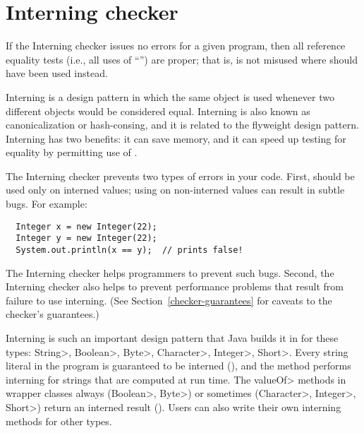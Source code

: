 \htmlhr
\chapter{Interning checker\label{interning-checker}}


If the Interning checker issues no errors for a given program, then all
reference equality tests (i.e., all uses of ``\code{==}'') are proper;
that is,
\code{==} is not misused where  should have been used instead.

Interning is a design pattern in which the same object is used whenever two
different objects would be considered equal.  Interning is also known as
canonicalization or hash-consing, and it is related to the flyweight design
pattern.
Interning has two benefits:  it can save memory, and it can speed up testing for
equality by permitting use of \code{==}.

The Interning checker prevents two types of errors in your code.  First, 
\code{==} should be used
only on interned values; using \code{==} on
non-interned values can result in subtle bugs.  For example:

\begin{Verbatim}
  Integer x = new Integer(22);
  Integer y = new Integer(22);
  System.out.println(x == y);  // prints false!
\end{Verbatim}

\noindent
The Interning checker helps programmers to prevent such bugs.
Second, 
the Interning checker also helps to prevent performance problems that result
from failure to use interning.
(See Section~\ref{checker-guarantees} for caveats to the checker's guarantees.)

Interning is such an important design pattern that Java builds it in for
these types: \<String>, \<Boolean>, \<Byte>, \<Character>, \<Integer>,
\<Short>.  Every string literal in the program is guaranteed to be interned
(), and the
 method
performs interning for strings that are computed at run time.
The \<valueOf> methods in wrapper classes always (\<Boolean>, \<Byte>) or
sometimes (\<Character>, \<Integer>, \<Short>) return an interned result
().
Users can also write their own interning methods for other types.

